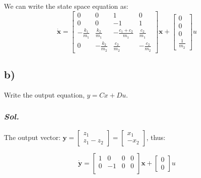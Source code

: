 We can write the state space equation as:
\begin{equation}
    \dot{\textbf{x}} =
        \begin{bmatrix}
        0                & 0                & 1                    & 0 \\
        0                & 0                & -1                   & 1 \\ 
        -\frac{k_1}{m_1} & \frac{k_2}{m_1}  & -\frac{c_1+c_2}{m_1} & \frac{c_2}{m_1}  \\ 
        0                & -\frac{k_2}{m_2} & \frac{c_2}{m_2}      & -\frac{c_2}{m_2}
    \end{bmatrix}
    \textbf{x} + 
    \begin{bmatrix}
        0\\
        0\\ 
        0\\ 
        \frac{1}{m_2}
    \end{bmatrix}
    u
\end{equation}

\subsection{b)}
Write the output equation, $y = Cx + Du$.
\subsubsection{\textit{ Sol. }}
The output vector: $\textbf{y} = 
\begin{bmatrix}
    z_1\\
    z_1 - z_2
\end{bmatrix} = 
\begin{bmatrix}
    x_1\\
    - x_2
\end{bmatrix}$, thus: 

\begin{equation}
    \dot{\textbf{y}} =
        \begin{bmatrix}
        1 & 0  & 0 & 0 \\
        0 & -1 & 0 & 0 \\ 
    \end{bmatrix}
    \textbf{x} + 
    \begin{bmatrix}
        0\\
        0
    \end{bmatrix}
    u
\end{equation}

\pagebreak